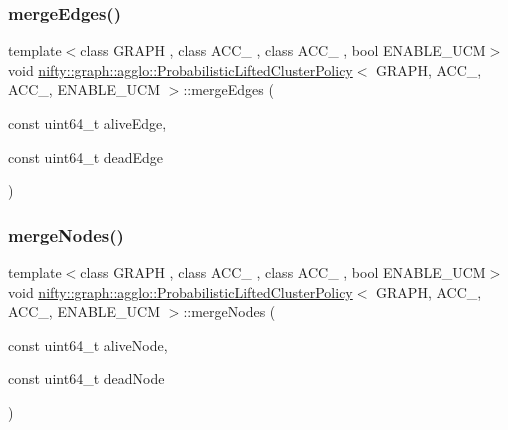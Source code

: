 \subsubsection{\texorpdfstring{merge\+Edges()}{mergeEdges()}}
{\footnotesize\ttfamily template$<$class G\+R\+A\+PH , class A\+C\+C\+\_ , class A\+C\+C\+\_ , bool E\+N\+A\+B\+L\+E\+\_\+\+U\+CM$>$ \\
void \hyperlink{classnifty_1_1graph_1_1agglo_1_1ProbabilisticLiftedClusterPolicy}{nifty\+::graph\+::agglo\+::\+Probabilistic\+Lifted\+Cluster\+Policy}$<$ G\+R\+A\+PH, A\+C\+C\+\_, A\+C\+C\+\_, E\+N\+A\+B\+L\+E\+\_\+\+U\+CM $>$\+::merge\+Edges (\begin{DoxyParamCaption}\item[{const uint64\+\_\+t}]{alive\+Edge,  }\item[{const uint64\+\_\+t}]{dead\+Edge }\end{DoxyParamCaption})\hspace{0.3cm}{\ttfamily [inline]}}

\mbox{\label{classnifty_1_1graph_1_1agglo_1_1ProbabilisticLiftedClusterPolicy_a04589e80c304fcae51817abbce67bc43}} 
\subsubsection{\texorpdfstring{merge\+Nodes()}{mergeNodes()}}
{\footnotesize\ttfamily template$<$class G\+R\+A\+PH , class A\+C\+C\+\_ , class A\+C\+C\+\_ , bool E\+N\+A\+B\+L\+E\+\_\+\+U\+CM$>$ \\
void \hyperlink{classnifty_1_1graph_1_1agglo_1_1ProbabilisticLiftedClusterPolicy}{nifty\+::graph\+::agglo\+::\+Probabilistic\+Lifted\+Cluster\+Policy}$<$ G\+R\+A\+PH, A\+C\+C\+\_, A\+C\+C\+\_, E\+N\+A\+B\+L\+E\+\_\+\+U\+CM $>$\+::merge\+Nodes (\begin{DoxyParamCaption}\item[{const uint64\+\_\+t}]{alive\+Node,  }\item[{const uint64\+\_\+t}]{dead\+Node }\end{DoxyParamCaption})\hspace{0.3cm}{\ttfamily [inline]}}



